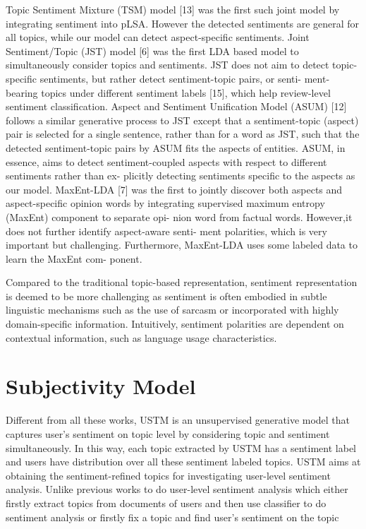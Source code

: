 \documentclass[runningheads,a4paper]{llncs}
\begin{document}
Topic Sentiment Mixture (TSM) model [13] was the first such joint model by integrating sentiment into pLSA. However the detected sentiments are general for all topics, while our model can detect aspect-specific sentiments. Joint Sentiment/Topic (JST) model [6] was the first LDA based model to simultaneously consider topics and sentiments. JST does not aim to detect topic-specific sentiments, but rather detect sentiment-topic pairs, or senti- ment-bearing topics under different sentiment labels [15], which help review-level sentiment classification. Aspect and Sentiment Unification Model (ASUM) [12] follows a similar generative process to JST except that a sentiment-topic (aspect) pair is selected for a single sentence, rather than for a word as JST, such that the detected sentiment-topic pairs by ASUM fits the aspects of entities. ASUM, in essence, aims to detect sentiment-coupled aspects with respect to different sentiments rather than ex- plicitly detecting sentiments specific to the aspects as our model. MaxEnt-LDA [7] was the first to jointly discover both aspects and aspect-specific opinion words by integrating supervised maximum entropy (MaxEnt) component to separate opi- nion word from factual words. However,it does not further identify aspect-aware senti- ment polarities, which is very important but challenging. Furthermore, MaxEnt-LDA uses some labeled data to learn the MaxEnt com- ponent.

Compared to the traditional topic-based representation, sentiment representation is deemed to be more challenging as sentiment is often embodied in subtle linguistic mechanisms such as the use of sarcasm or incorporated with highly domain-specific information. Intuitively, sentiment polarities are dependent on contextual information, such as language usage characteristics.

\section{Subjectivity Model}
Different from all these works, USTM is an unsupervised generative model that captures user’s sentiment on topic level by considering topic and sentiment simultaneously. In this way, each topic extracted by USTM has a sentiment label and users have distribution over all these sentiment labeled topics. USTM aims at obtaining the sentiment-refined topics for investigating user-level sentiment analysis. Unlike previous works to do user-level sentiment analysis which either firstly extract topics from documents of users and then use classifier to do sentiment analysis or firstly fix a topic and find user’s sentiment on the topic\cite{tan2011user}
\end{document}
